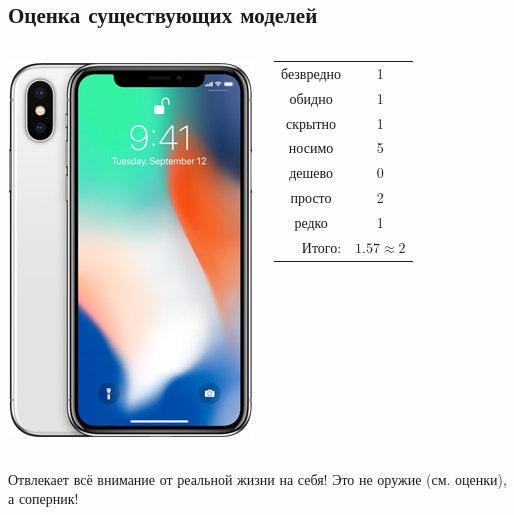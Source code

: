 \subsection{Оценка существующих моделей}

\begin{frame}  %
    \begin{columns}
            \begin{center}
                \includegraphics[height=.8\textheight]{fig/iphoneX}
            \end{center}
            
            \begin{center}
                \begin{tabular}{c|c}
                    \hline
                    безвредно                   & 1 \\
                    обидно                      & 1 \\
                    скрытно                     & 1 \\
                    носимо                      & 5 \\
                    дешево                      & 0 \\
                    просто                      & 2 \\ 
                    редко                       & 1 \\ \hline
                    \multicolumn{1}{r|}{Итого:} & $1.57\approx 2$ \\
                \end{tabular}
            \end{center}
    \end{columns}    
    
    Отвлекает \alert{всё} внимание от \alert{реальной жизни} на себя! Это \alert{не оружие} (см. оценки), а \alert{соперник}!
\end{frame}

